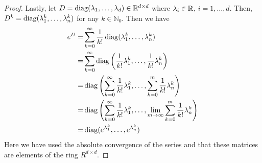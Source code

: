 \begin{proof}
    Lastly, let $D = \operatorname{diag}(\lambda_1, \dots, \lambda_d) \in \mathbb R^{d \times d}$
	where $\lambda_i \in \mathbb R$, $i= 1, \dots, d$. Then, $D^k = \operatorname{diag}(\lambda_1^k,
	\dots, \lambda_n^k)$ for any $k \in \mathbb N_0$. Then we have
	\begin{align}
	e^D =& \sum_{k=0}^\infty \frac{1}{k!} \operatorname{diag}(\lambda_1^k, \dots, \lambda_n^k) \\
	=& \sum_{k=0}^\infty \operatorname{diag} \left(\frac{1}{k!}\lambda_1^k, \dots,
		\frac{1}{k!}\lambda_n^k \right) \\
	=& \operatorname{diag} \left(\sum_{k=0}^\infty \frac{1}{k!} \lambda_1^k, \dots, \sum _{k=0} ^m
		\frac{1}{k!}\lambda_n^k \right) \\
	=& \operatorname{diag} \left(\sum_{k=0}^\infty \frac{1}{k!} \lambda_1^k, \dots, \lim_{m \to \infty}
		\sum _{k=0} ^m \frac{1}{k!}\lambda_n^k 	\right) \\
	=& \operatorname{diag}(e^{\lambda_1^k}, \dots, e^{\lambda_n^k})
	\end{align}
	Here we have used the absolute convergence of the series and that these matrices are
	elements of the ring $R^{d \times d}$.
	\end{proof}

